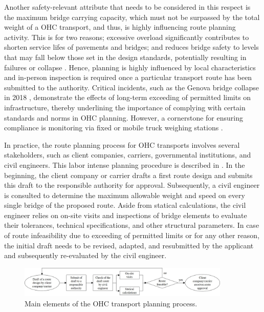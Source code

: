 Another safety-relevant attribute that needs to be considered in this respect is the maximum bridge carrying capacity, which must not be surpassed by the total weight of a OHC transport, and thus, is highly influencing route planning activity.
This is for two reasons; excessive overload significantly contributes to shorten service lifes of pavements and bridges; and reduces bridge safety to levels that may fall below those set in the design standards, potentially resulting in failures or collapse \cite{fiorillo2018fragility, yan2018optimal, ghosn2000development}. Hence, planning is highly influenced by local characteristics and in-person inspection is required once a particular transport route has been submitted to the authority.
Critical incidents, such as the Genova bridge collapse in 2018 \cite{Morgese.2020, MorandiNYTimes},  demonstrate the effects of long-term exceeding of permitted limits on infrastructure, thereby underlining the importance of complying with certain standards and norms in OHC planning. However, a cornerstone for ensuring compliance is monitoring via fixed or mobile truck weighing stations \cite{fiorillo2016minimizing}.
\par In practice, the route planning process for OHC transports involves several stakeholders, such as client companies, carriers, governmental institutions, and civil engineers.
This labor intense planning procedure is described in \cite{Osegueda.1999}. In the beginning, the client company or carrier drafts a first route design and submits this draft to the responsible authority for approval.
Subsequently, a civil engineer is consulted to determine the maximum allowable weight and speed on every single bridge of the proposed route.
Aside from statical calculations, the civil engineer relies on on-site visits and inspections of bridge elements to evaluate their tolerances, technical specifications, and other structural parameters.
In case of route infeasibility due to exceeding of permitted limits or for any other reason, the initial draft needs to be revised, adapted, and resubmitted by the applicant and subsequently re-evaluated by the civil engineer.

\begin{figure}[!ht]
  \centering
  \includegraphics[width=0.9\textwidth]{final.jpg}
  \caption{Main elements of the OHC transport planning process.}
  \label{fig:higher level}
\end{figure}

